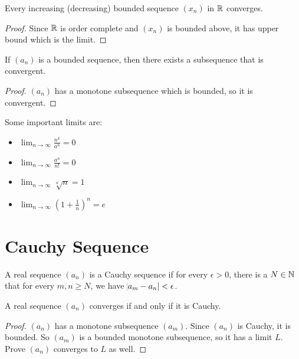 \begin{theorem}
    Every increasing (decreasing) bounded sequence $(x_n)$ in $\mathbb{R}$ converges. 
\end{theorem}
\begin{proof}
    Since $\mathbb{R}$ is order complete and $(x_n)$ is bounded above, it has upper bound which is the limit.
\end{proof}


\begin{theorem}
    If $(a_n)$ is a bounded sequence, then there exists a subsequence that is convergent.
\end{theorem}
\begin{proof}
    $(a_n)$ has a monotone subsequence which is bounded, so it is convergent.
\end{proof}


Some important limits are:
\begin{itemize}
    \item $\displaystyle \lim_{n \rightarrow \infty} \frac{n^k}{a^n} = 0$
    \item $\displaystyle \lim_{n \rightarrow \infty} \frac{a^n}{n!} = 0$
    \item $\displaystyle \lim_{n \rightarrow \infty} \sqrt[n]{n} = 1$
    \item $\displaystyle \lim_{n \rightarrow \infty} \left(1+\frac{1}{n} \right)^n = e$
\end{itemize}



\section{Cauchy Sequence}

\begin{definition}
    A real sequence $(a_n)$ is a Cauchy sequence if for every $\epsilon > 0$, there is a $N \in \mathbb{N}$ that for every $m,n \geq N$, we have $\abs{a_m - a_n} < \epsilon$.
\end{definition}

\begin{theorem}
    A real sequence $(a_n)$ converges if and only if it is Cauchy.
\end{theorem}
\begin{proof}
    $(a_n)$ has a monotone subsequence $(a_m)$. Since $(a_n)$ is Cauchy, it is bounded. So $(a_m)$ is a bounded monotone subsequence, so it has a limit $L$. Prove $(a_n)$ converges to $L$ as well.
\end{proof}


